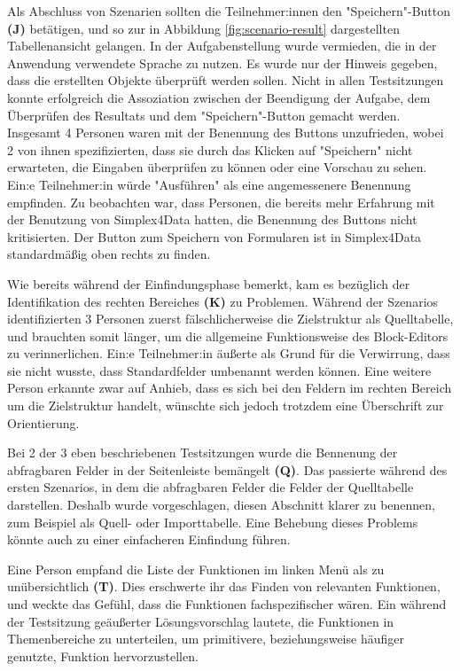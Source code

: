 Als Abschluss von Szenarien sollten die Teilnehmer:innen den "Speichern"-Button \textbf{(J)} betätigen, und so zur in Abbildung \ref{fig:scenario-result} dargestellten Tabellenansicht gelangen. In der Aufgabenstellung wurde vermieden, die in der Anwendung verwendete Sprache zu nutzen. Es wurde nur der Hinweis gegeben, dass die erstellten Objekte überprüft werden sollen. Nicht in allen Testsitzungen konnte erfolgreich die Assoziation zwischen der Beendigung der Aufgabe, dem Überprüfen des Resultats und dem "Speichern"-Button gemacht  werden. Insgesamt 4 Personen waren mit der Benennung des Buttons unzufrieden, wobei 2 von ihnen spezifizierten, dass sie durch das Klicken auf "Speichern" nicht erwarteten, die Eingaben überprüfen zu können oder eine Vorschau zu sehen. Ein:e Teilnehmer:in würde "Ausführen" als eine angemessenere Benennung empfinden. Zu beobachten war, dass Personen, die bereits mehr Erfahrung mit der Benutzung von Simplex4Data hatten, die Benennung des Buttons nicht kritisierten. Der Button zum Speichern von Formularen ist in Simplex4Data standardmäßig oben rechts zu finden.

Wie bereits während der Einfindungsphase bemerkt, kam es bezüglich der Identifikation des rechten Bereiches \textbf{(K)} zu Problemen. Während der Szenarios identifizierten 3 Personen zuerst fälschlicherweise die Zielstruktur als Quelltabelle, und brauchten somit länger, um die allgemeine Funktionsweise des Block-Editors zu verinnerlichen. Ein:e Teilnehmer:in äußerte als Grund für die Verwirrung, dass sie nicht wusste, dass Standardfelder umbenannt werden können. Eine weitere Person erkannte zwar auf Anhieb, dass es sich bei den Feldern im rechten Bereich um die Zielstruktur handelt, wünschte sich jedoch trotzdem eine Überschrift zur Orientierung.

Bei 2 der 3 eben beschriebenen Testsitzungen wurde die Bennenung der abfragbaren Felder in der Seitenleiste bemängelt \textbf{(Q)}. Das passierte während des ersten Szenarios, in dem die abfragbaren Felder die Felder der Quelltabelle darstellen. Deshalb wurde vorgeschlagen, diesen Abschnitt klarer zu benennen, zum Beispiel als Quell- oder Importtabelle. Eine Behebung dieses Problems könnte auch zu einer einfacheren Einfindung führen.

Eine Person empfand die Liste der Funktionen im linken Menü als zu unübersichtlich \textbf{(T)}. Dies erschwerte ihr das Finden von relevanten Funktionen, und weckte das Gefühl, dass die Funktionen fachspezifischer wären. Ein während der Testsitzung geäußerter Lösungsvorschlag lautete, die Funktionen in Themenbereiche zu unterteilen, um primitivere, beziehungsweise häufiger genutzte, Funktion hervorzustellen.

